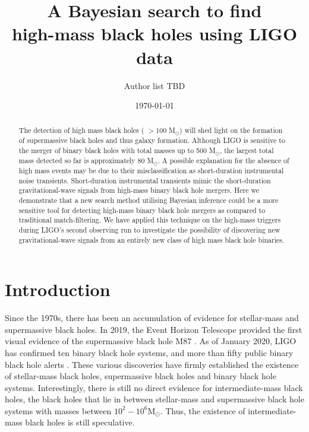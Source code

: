 \documentclass[%
 reprint,
 amsmath,amssymb,
 aps,
]{revtex4}
\begin{document}

\title{A Bayesian search to find \\high-mass black holes using LIGO data}%


\author{Author list TBD}

\date{\today}

\begin{abstract}
The detection of high mass black holes ( $>100$ M${}_\odot$) will shed light on the formation of supermassive black holes and thus galaxy formation. Although LIGO is sensitive to the merger of binary black holes with total masses up to 500 M${}_\odot$, the largest total mass detected so far is approximately 80 M${}_\odot$. A possible explanation for the absence of high mass events may be due to their misclassification as short-duration instrumental noise transients. Short-duration instrumental transients mimic the short-duration gravitational-wave signals from high-mass binary black hole mergers. Here we demonstrate that a new search method utilising Bayesian inference could be a more sensitive tool for detecting high-mass binary black hole mergers as compared to traditional match-filtering. We have applied this technique on the high-mass triggers during LIGO's second observing run to investigate the possibility of discovering new gravitational-wave signals from an entirely new class of high mass black hole binaries.


\end{abstract}

\maketitle



\section{\label{sec:Introduction}Introduction}

Since the 1970s, there has been an accumulation of evidence for stellar-mass and supermassive black holes. In 2019, the Event Horizon Telescope provided the first visual evidence of the supermassive black hole M87  \cite{m87photo}.  As of January 2020, LIGO has confirmed ten binary black hole systems, and more than fifty public binary black hole alerts \cite{gw190814}. These various discoveries have firmly established the existence of stellar-mass black holes, supermassive black holes and binary black hole systems.  Interestingly, there is still no direct evidence for intermediate-mass black holes, the black holes that lie in between stellar-mass and supermassive black hole systems with masses between $10^2-10^6 \text{M}_\odot$. Thus, the existence of intermediate-mass black holes is still speculative. \\
\end{document}
